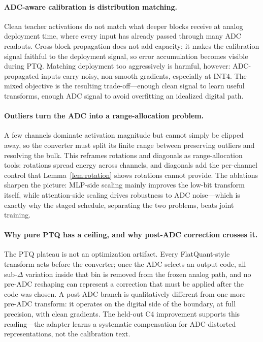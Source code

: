 \documentclass[letterpaper]{article} %
\theoremstyle{plain}
\begin{document}
\paragraph{ADC-aware calibration is distribution matching.}
Clean teacher activations do not match what deeper blocks receive at analog deployment time, where every input has already passed through many ADC readouts. Cross-block propagation does not add capacity; it makes the calibration signal faithful to the deployment signal, so error accumulation becomes visible during PTQ. Matching deployment too aggressively is harmful, however: ADC-propagated inputs carry noisy, non-smooth gradients, especially at INT4. The mixed objective is the resulting trade-off---enough clean signal to learn useful transforms, enough ADC signal to avoid overfitting an idealized digital path.

\paragraph{Outliers turn the ADC into a range-allocation problem.}
A few channels dominate activation magnitude but cannot simply be clipped away, so the converter must split its finite range between preserving outliers and resolving the bulk. This reframes rotations and diagonals as range-allocation tools: rotations spread energy across channels, and diagonals add the per-channel control that Lemma~\ref{lem:rotation} shows rotations cannot provide. The ablations sharpen the picture: MLP-side scaling mainly improves the low-bit transform itself, while attention-side scaling drives robustness to ADC noise---which is exactly why the staged schedule, separating the two problems, beats joint training.

\paragraph{Why pure PTQ has a ceiling, and why post-ADC correction crosses it.}
The PTQ plateau is not an optimization artifact. Every FlatQuant-style transform acts before the converter; once the ADC selects an output code, all sub-$\Delta$ variation inside that bin is removed from the frozen analog path, and no pre-ADC reshaping can represent a correction that must be applied after the code was chosen. A post-ADC branch is qualitatively different from one more pre-ADC transform: it operates on the digital side of the boundary, at full precision, with clean gradients. The held-out C4 improvement supports this reading---the adapter learns a systematic compensation for ADC-distorted representations, not the calibration text.
\end{document}
